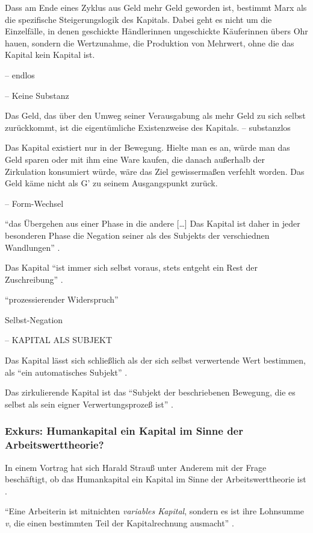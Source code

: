 \documentclass[12pt,
               DIV13,
               paper=a4,
               twoside=false,
               onehalfspacing,
               bibliography=totoc,
               toc=graduated,
               draft,
               ]{scrartcl}
\newcommand{\lips}{\dots\unkern}
\newcommand{\pc}[2]{\parencite[#1]{#2}}
\newcommand{\vgl}[2]{\parencite[vgl.][#1]{#2}}
\newcommand{\zn}[3]{\parencite[#1, zit. nach][#2]{#3}}
\begin{document}
Dass am Ende eines Zyklus aus Geld mehr Geld geworden ist, bestimmt
Marx als die spezifische Steigerungslogik des Kapitals. Dabei geht es
nicht um die Einzelfälle, in denen geschickte Händlerinnen ungeschickte
Käuferinnen übers Ohr hauen, sondern die Wertzunahme, die Produktion
von Mehrwert, ohne die das Kapital kein Kapital ist.

-- endlos

-- Keine Substanz

Das Geld, das über den Umweg seiner Verausgabung als mehr
Geld zu sich selbst zurückkommt, ist die eigentümliche Existenzweise
des Kapitals. -- substanzlos



Das Kapital existiert nur in der Bewegung. Hielte man es an, würde man
das Geld sparen oder mit ihm eine Ware kaufen, die danach außerhalb
der Zirkulation konsumiert würde, wäre das Ziel gewissermaßen verfehlt
worden. Das Geld käme nicht als G' zu seinem Ausgangspunkt zurück.

-- Form-Wechsel

"`das Übergehen aus einer Phase in die andere [\lips] Das Kapital ist
daher in jeder besonderen Phase die Negation seiner als des Subjekts
der verschiednen Wandlungen"' \zn{Marx}{181}{reichelt}.

Das Kapital "`ist immer sich selbst voraus, stets entgeht ein Rest der
Zuschreibung"' \pc{125}{strauss}.

"`prozessierender Widerspruch"'

Selbst-Negation

-- KAPITAL ALS SUBJEKT

Das Kapital lässt sich schließlich als der sich selbst verwertende
Wert bestimmen, als "`ein automatisches Subjekt"' \pc{169}{kap}.

Das zirkulierende Kapital ist das "`Subjekt der beschriebenen
Bewegung, die es selbst als sein eigner Verwertungsprozeß ist"'
\zn{Marx}{181}{reichelt}.

\subsubsection{Exkurs: Humankapital ein Kapital im Sinne der
Arbeitswerttheorie?}

In einem Vortrag hat sich Harald Strauß unter Anderem mit der Frage
beschäftigt, ob das Humankapital ein Kapital im Sinne der
Arbeitswerttheorie ist \vgl{}{strauss}.

"`Eine Arbeiterin ist mitnichten \emph{variables Kapital}, sondern es
ist ihre Lohnsumme \emph{v}, die einen bestimmten Teil der
Kapitalrechnung ausmacht"' \pc{126}{strauss}.
\end{document}
